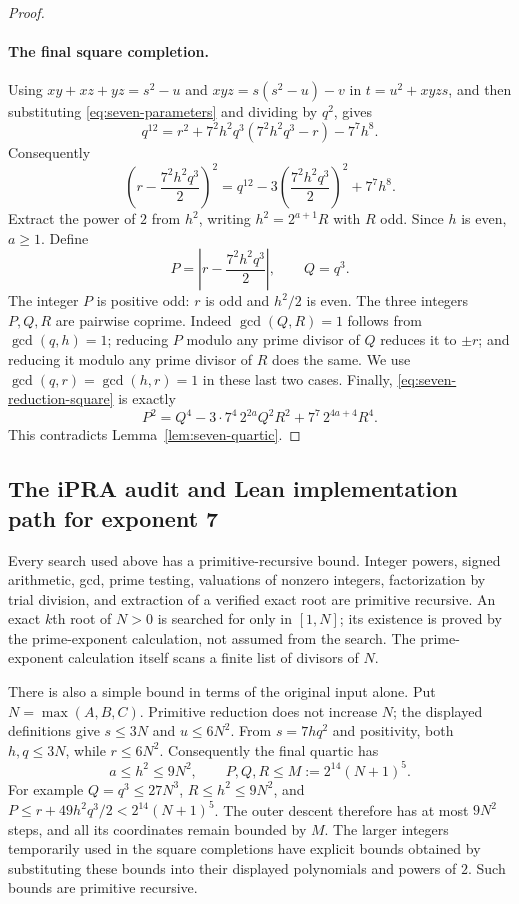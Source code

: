 \begin{proof}
\paragraph{The final square completion.}
Using $xy+xz+yz=s^2-u$ and $xyz=s(s^2-u)-v$ in $t=u^2+xyzs$, and then
substituting \eqref{eq:seven-parameters} and dividing by $q^2$, gives
\[
 q^{12}=r^2+7^2h^2q^3(7^2h^2q^3-r)-7^7h^8.
\]
Consequently
\begin{equation}\label{eq:seven-reduction-square}
 \left(r-\frac{7^2h^2q^3}{2}\right)^2
 =q^{12}-3\left(\frac{7^2h^2q^3}{2}\right)^2+7^7h^8.
\end{equation}
Extract the power of $2$ from $h^2$, writing $h^2=2^{a+1}R$ with $R$ odd.
Since $h$ is even, $a\geq1$.  Define
\[
 P=\left|r-\frac{7^2h^2q^3}{2}\right|,\qquad Q=q^3.
\]
The integer $P$ is positive odd: $r$ is odd and $h^2/2$ is even.
The three integers $P,Q,R$ are pairwise coprime.  Indeed $\gcd(Q,R)=1$
follows from $\gcd(q,h)=1$; reducing $P$ modulo any prime divisor of $Q$
reduces it to $\pm r$; and reducing it modulo any prime divisor of $R$
does the same.  We use $\gcd(q,r)=\gcd(h,r)=1$ in these last two cases.
Finally, \eqref{eq:seven-reduction-square} is exactly
\[
 P^2=Q^4-3\cdot7^4\,2^{2a}Q^2R^2+7^7\,2^{4a+4}R^4.
\]
This contradicts Lemma~\ref{lem:seven-quartic}.
\end{proof}

\subsection{The iPRA audit and Lean implementation path for exponent 7}

Every search used above has a primitive-recursive bound.  Integer powers,
signed arithmetic, gcd, prime testing, valuations of nonzero integers,
factorization by trial division, and extraction of a verified exact root
are primitive recursive.  An exact $k$th root of $N>0$ is searched for only
in $[1,N]$; its existence is proved by the prime-exponent calculation, not
assumed from the search.  The prime-exponent calculation itself scans a
finite list of divisors of $N$.

There is also a simple bound in terms of the original input alone.  Put
$N=\max(A,B,C)$.  Primitive reduction does not increase $N$; the displayed
definitions give $s\leq3N$ and $u\leq6N^2$.  From
$s=7hq^2$ and positivity, both $h,q\leq3N$, while $r\leq6N^2$.
Consequently the final quartic has
\[
 a\leq h^2\leq9N^2,\qquad
 P,Q,R\leq M:=2^{14}(N+1)^5.
\]
For example $Q=q^3\leq27N^3$, $R\leq h^2\leq9N^2$, and
$P\leq r+49h^2q^3/2<2^{14}(N+1)^5$.  The outer descent therefore has
at most $9N^2$ steps, and all its coordinates remain bounded by $M$.
The larger integers temporarily used in the square completions have
explicit bounds obtained by substituting these bounds into their displayed
polynomials and powers of $2$.  Such bounds are primitive recursive.

